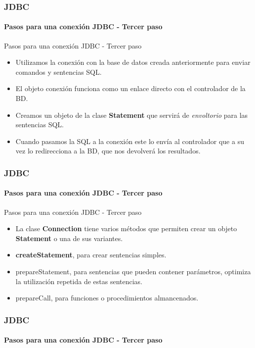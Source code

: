 \documentclass{beamer}
\begin{document}
	\begin{frame}
		\frametitle{JDBC}
		\framesubtitle{Pasos para una conexi\'on JDBC - Tercer paso}

        \begin{exampleblock}{Pasos para una conexi\'on JDBC - Tercer paso}
		    \begin{itemize}
		        \item Utilizamos la conexi\'on con la base de datos creada anteriormente para enviar comandos y sentencias SQL.
		        \item El objeto conexi\'on funciona como un enlace directo con el controlador de la BD.
		        \item Creamos un objeto de la clase \textbf{Statement} que servir\'a de \emph{envoltorio} para las sentencias SQL.
		        \item Cuando pasamos la SQL a la conexi\'on este lo env\'ia al controlador que a su vez lo redirecciona a la BD, que nos devolver\'a los resultados.
		    \end{itemize}
		    \end{exampleblock}
	\end{frame}    
 
	\begin{frame}
		\frametitle{JDBC}
		\framesubtitle{Pasos para una conexi\'on JDBC - Tercer paso}

        \begin{exampleblock}{Pasos para una conexi\'on JDBC - Tercer paso}
		    \begin{itemize}
		        \item La clase \textbf{Connection} tiene varios m\'etodos que permiten crear un objeto \textbf{Statement} o una de sus variantes.
		        \item \textbf{createStatement}, para crear sentencias simples.
		        \item prepareStatement, para sentencias que pueden contener par\'ametros, optimiza la utilizaci\'on repetida de estas sentencias.
		        \item prepareCall, para funciones o procedimientos almancenados.
		    \end{itemize}
		    \end{exampleblock}
	\end{frame}    	
	
    \begin{frame}
		\frametitle{JDBC}
		\framesubtitle{Pasos para una conexi\'on JDBC - Tercer paso}

               
	\end{frame}		
	
\end{document}
